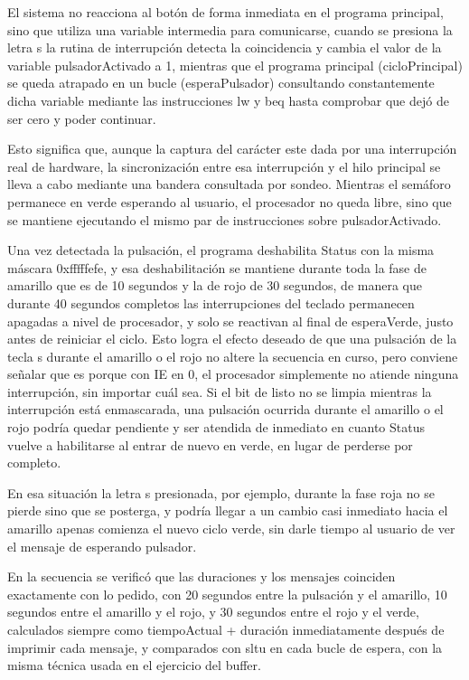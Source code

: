 \documentclass[12pt, letterpaper]{article}
\begin{document}
El sistema no reacciona al botón de forma inmediata en el programa principal, sino que utiliza una variable intermedia para comunicarse, cuando se presiona la letra s la rutina de interrupción detecta la coincidencia y cambia el valor de la variable pulsadorActivado a 1, mientras que el programa principal (cicloPrincipal) se queda atrapado en un bucle (esperaPulsador) consultando constantemente dicha variable mediante las instrucciones lw y beq hasta comprobar que dejó de ser cero y poder continuar.

Esto significa que, aunque la captura del carácter este dada por una interrupción real de hardware, la sincronización entre esa interrupción y el hilo principal se lleva a cabo mediante una bandera consultada por sondeo. Mientras el semáforo permanece en verde esperando al usuario, el procesador no queda libre, sino que se mantiene ejecutando el mismo par de instrucciones sobre pulsadorActivado.

Una vez detectada la pulsación, el programa deshabilita Status con la misma máscara 0xfffffefe, y esa deshabilitación se mantiene durante toda la fase de amarillo que es de 10 segundos y la de rojo de 30 segundos, de manera que durante 40 segundos completos las interrupciones del teclado permanecen apagadas a nivel de procesador, y solo se reactivan al final de esperaVerde, justo antes de reiniciar el ciclo. Esto logra el efecto deseado de que una pulsación de la tecla s durante el amarillo o el rojo no altere la secuencia en curso, pero conviene señalar que es porque con IE en 0, el procesador simplemente no atiende ninguna interrupción, sin importar cuál sea. Si el bit de listo no se limpia mientras la interrupción está enmascarada, una pulsación ocurrida durante el amarillo o el rojo podría quedar pendiente y ser atendida de inmediato en cuanto Status vuelve a habilitarse al entrar de nuevo en verde, en lugar de perderse por completo.

En esa situación la letra s presionada, por ejemplo, durante la fase roja no se pierde sino que se posterga, y podría llegar a un cambio casi inmediato hacia el amarillo apenas comienza el nuevo ciclo verde, sin darle tiempo al usuario de ver el mensaje de esperando pulsador.

En la secuencia se verificó que las duraciones y los mensajes coinciden exactamente con lo pedido, con 20 segundos entre la pulsación y el amarillo, 10 segundos entre el amarillo y el rojo, y 30 segundos entre el rojo y el verde, calculados siempre como tiempoActual + duración inmediatamente después de imprimir cada mensaje, y comparados con sltu en cada bucle de espera, con la misma técnica usada en el ejercicio del buffer.
\end{document}
